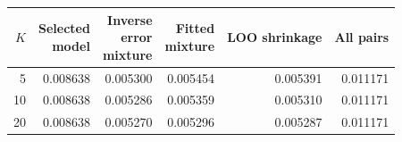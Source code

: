 \begin{tabular}{rrrrrr}
\toprule
$K$ & \shortstack[r]{Selected\\model} & \shortstack[r]{Inverse\\error\\mixture} & \shortstack[r]{Fitted\\mixture} & LOO shrinkage & All pairs \\
\midrule
5 & 0.008638 & 0.005300 & 0.005454 & 0.005391 & 0.011171 \\
10 & 0.008638 & 0.005286 & 0.005359 & 0.005310 & 0.011171 \\
20 & 0.008638 & 0.005270 & 0.005296 & 0.005287 & 0.011171 \\
\bottomrule
\end{tabular}
